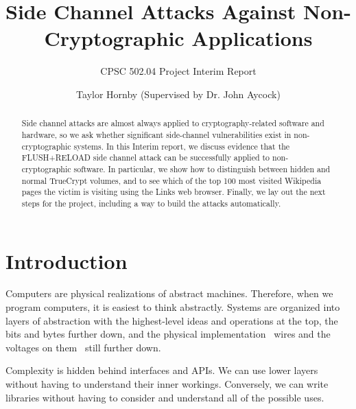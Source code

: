 \documentclass{acm_proc_article-sp}
\begin{document}
\sloppy

\title{Side Channel Attacks Against Non-Cryptographic Applications}
\subtitle{CPSC 502.04 Project Interim Report}


\author{
\alignauthor
Taylor Hornby (Supervised by Dr. John Aycock)\\
}

\maketitle

\begin{abstract}
Side channel attacks are almost always applied to cryptography-related software
and hardware, so we ask whether significant side-channel vulnerabilities exist
in non-cryptographic systems. In this Interim report, we discuss evidence that
the FLUSH+RELOAD side channel attack can be successfully applied to
non-cryptographic software. In particular, we show how to distinguish between
hidden and normal TrueCrypt volumes, and to see which of the top 100 most
visited Wikipedia pages the victim is visiting using the Links web browser.
Finally, we lay out the next steps for the project, including a way to build the
attacks automatically.
\end{abstract}

\section{Introduction}
\label{sec:attacks}

Computers are physical realizations of abstract machines. Therefore, when we
program computers, it is easiest to think abstractly. Systems are organized into
layers of abstraction with the highest-level ideas and operations at the top,
the bits and bytes further down, and the physical implementation \textendash\
wires and the voltages on them \textendash\ still further down.

Complexity is hidden behind interfaces and APIs. We can use lower layers without
having to understand their inner workings. Conversely, we can write libraries
without having to consider and understand all of the possible uses.
\end{document}
